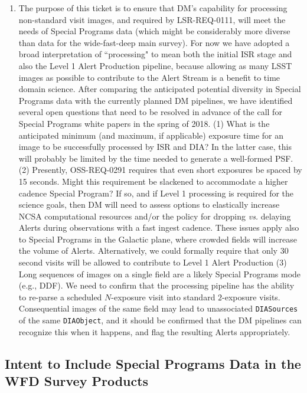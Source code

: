 \documentclass[DM,lsstdraft,toc]{lsstdoc}
\begin{document}
\begin{enumerate}[resume,topsep=-10pt,after=\vspace{10pt},label= \textbf{Action \Roman*}] \item \label{NSV-1} The purpose of this ticket is to ensure that DM's capability for processing non-standard visit images, and required by LSR-REQ-0111, will meet the needs of Special Programs data (which might be considerably more diverse than data for the wide-fast-deep main survey). For now we have adopted a broad interpretation of ``processing" to mean both the initial ISR stage and also the Level 1 Alert Production pipeline, because allowing as many LSST images as possible to contribute to the Alert Stream is a benefit to time domain science. After comparing the anticipated potential diversity in Special Programs data with the currently planned DM pipelines, we have identified several open questions that need to be resolved in advance of the call for Special Programs white papers in the spring of 2018. (1) What is the anticipated minimum (and maximum, if applicable) exposure time for an image to be successfully processed by ISR and DIA? In the latter case, this will probably be limited by the time needed to generate a well-formed PSF. (2) Presently, OSS-REQ-0291 requires that even short exposures be spaced by 15 seconds. Might this requirement be slackened to accommodate a higher cadence Special Program? If so, and if Level 1 processing is required for the science goals, then DM will need to assess options to elastically increase NCSA computational resources and/or the policy for dropping \textit{vs.} delaying Alerts during observations with a fast ingest cadence. These issues apply also to Special Programs in the Galactic plane, where crowded fields will increase the volume of Alerts. Alternatively, we could formally require that only 30 second visits will be allowed to contribute to Level 1 Alert Production (3) Long sequences of images on a single field are a likely Special Programs mode (e.g., DDF). We need to confirm that the processing pipeline has the ability to re-parse a scheduled $N$-exposure visit into standard $2$-exposure visits. Consequential images of the same field may lead to unassociated \texttt{DIASources} of the same \texttt{DIAObject}, and it should be confirmed that the DM pipelines can recognize this when it happens, and flag the resulting Alerts appropriately. \end{enumerate}


\subsection{Intent to Include Special Programs Data in the WFD Survey Products}\label{ssec:dmplans_WFD}
\end{document}
